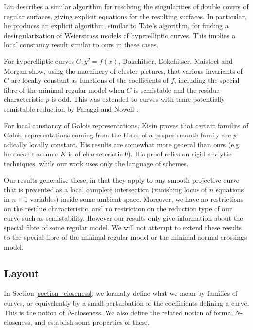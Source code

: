 \documentclass{article}
\theoremstyle{definition}
\theoremstyle{plain}
\theoremstyle{remark}
\begin{document}
	Liu \cite{liu2025desingularizationdoublecoversregular} describes a similar algorithm for resolving the singularities of double covers of regular surfaces, giving explicit equations for the resulting surfaces. In particular, he produces an explicit algorithm, similar to Tate's algorithm, for finding a desingularization of Weierstrass models of hyperelliptic curves. This implies a local constancy result similar to ours in these cases.
	
	For hyperelliptic curves $C: y^2 = f(x)$, Dokchitser, Dokchitser, Maistret and Morgan \cite[Theorem 1.29]{dokchitser2018arithmetic}
	show, using the machinery of cluster pictures, that various invariants of $C$ are locally constant as functions of the coefficients of $f$, including the special fibre of the minimal regular model when $C$ is semistable and the residue characteristic $p$ is odd. This was extended to curves with tame potentially semistable reduction by Faraggi and Nowell \cite{Faraggi-Nowell}.
	
	For local constancy of Galois representations, Kisin \cite{kisin_local_constancy} proves that certain families of Galois representations coming from the fibres of a proper smooth family are $p$-adically locally constant. His results are somewhat more general than ours (e.g. he doesn't assume $K$ is of characteristic 0). His proof relies on rigid analytic techniques, while our work uses only the language of schemes.
	
	Our results generalise these, in that they apply to any smooth projective curve that is presented as a local complete intersection (vanishing locus of $n$ equations in $n+1$ variables) inside some ambient space. Moreover, we have no restrictions on the residue characteristic, and no restriction on the reduction type of our curve such as semistability. However our results only give information about the special fibre of some regular model. We will not attempt to extend these results to the special fibre of the minimal regular model or the minimal normal crossings model.
	
	\subsection{Layout}
	In Section \ref{section_closeness}, we formally define what we mean by families of curves, or equivalently by a small perturbation of the coefficients defining a curve. This is the notion of $N$-closeness. We also define the related notion of formal $N$-closeness, and establish some properties of these.
	
\end{document}
